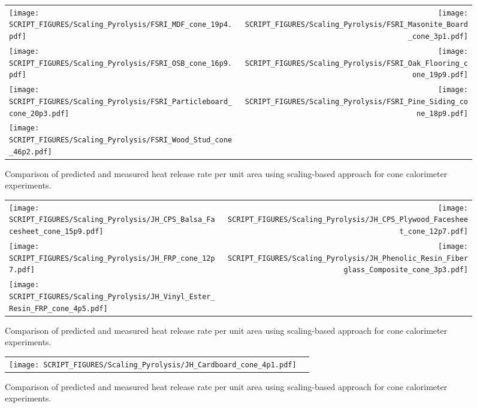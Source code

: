 \begin{figure}[p]
\begin{tabular*}{\textwidth}{l@{\extracolsep{\fill}}r}
\texttt{[image: SCRIPT\_FIGURES/Scaling\_Pyrolysis/FSRI\_MDF\_cone\_19p4.pdf]} &
\texttt{[image: SCRIPT\_FIGURES/Scaling\_Pyrolysis/FSRI\_Masonite\_Board\_cone\_3p1.pdf]} \\
\texttt{[image: SCRIPT\_FIGURES/Scaling\_Pyrolysis/FSRI\_OSB\_cone\_16p9.pdf]} &
\texttt{[image: SCRIPT\_FIGURES/Scaling\_Pyrolysis/FSRI\_Oak\_Flooring\_cone\_19p9.pdf]} \\
\texttt{[image: SCRIPT\_FIGURES/Scaling\_Pyrolysis/FSRI\_Particleboard\_cone\_20p3.pdf]} &
\texttt{[image: SCRIPT\_FIGURES/Scaling\_Pyrolysis/FSRI\_Pine\_Siding\_cone\_18p9.pdf]} \\
\texttt{[image: SCRIPT\_FIGURES/Scaling\_Pyrolysis/FSRI\_Wood\_Stud\_cone\_46p2.pdf]} &
\end{tabular*}
\caption[HRRPUA of FSRI Materials using scaling model , Wood-Based materials]
{Comparison of predicted and measured heat release rate per unit area using scaling-based approach for cone calorimeter experiments.}
\label{FSRI_Materials_HRR_Wood-Based}
\end{figure}

\begin{figure}[p]
\begin{tabular*}{\textwidth}{l@{\extracolsep{\fill}}r}
\texttt{[image: SCRIPT\_FIGURES/Scaling\_Pyrolysis/JH\_CPS\_Balsa\_Facesheet\_cone\_15p9.pdf]} &
\texttt{[image: SCRIPT\_FIGURES/Scaling\_Pyrolysis/JH\_CPS\_Plywood\_Facesheet\_cone\_12p7.pdf]} \\
\texttt{[image: SCRIPT\_FIGURES/Scaling\_Pyrolysis/JH\_FRP\_cone\_12p7.pdf]} &
\texttt{[image: SCRIPT\_FIGURES/Scaling\_Pyrolysis/JH\_Phenolic\_Resin\_Fiberglass\_Composite\_cone\_3p3.pdf]} \\
\texttt{[image: SCRIPT\_FIGURES/Scaling\_Pyrolysis/JH\_Vinyl\_Ester\_Resin\_FRP\_cone\_4p5.pdf]} &
\end{tabular*}
\caption[HRRPUA of JH Materials using scaling model ]
{Comparison of predicted and measured heat release rate per unit area using scaling-based approach for cone calorimeter experiments.}
\label{JH_Materials_HRR_Mixtures}
\end{figure}

\begin{figure}[p]
\begin{tabular*}{\textwidth}{l@{\extracolsep{\fill}}r}
\texttt{[image: SCRIPT\_FIGURES/Scaling\_Pyrolysis/JH\_Cardboard\_cone\_4p1.pdf]} &
\end{tabular*}
\caption[HRRPUA of JH Materials using scaling model ]
{Comparison of predicted and measured heat release rate per unit area using scaling-based approach for cone calorimeter experiments.}
\label{JH_Materials_HRR_Others}
\end{figure}

